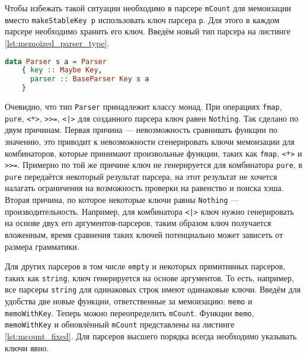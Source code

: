 \documentclass[times]{itmo-student-thesis}
\begin{document}
Чтобы избежать такой ситуации необходимо в парсере \lstinline{mCount} для мемоизации вместо \lstinline{makeStableKey p}
использовать ключ парсера \lstinline{p}. Для этого в каждом парсере необходимо хранить его ключ. Введём новый тип парсера на листинге \ref{lst:memoized_parser_type}. 

\begin{lstlisting}[language=Haskell,float=!h,caption={Тип парсера с ключом},label={lst:memoized_parser_type}]
  data Parser s a = Parser
    { key :: Maybe Key,
      parser :: BaseParser Key s a
    }
\end{lstlisting}

Очевидно, что тип \lstinline{Parser} принадлежит классу монад. При операциях \lstinline{fmap},
\lstinline{pure}, \lstinline{<*>}, \lstinline{>>=}, \lstinline{<|>} для созданного парсера
ключ равен \lstinline{Nothing}. Так сделано по двум причинам. Первая причина --- невозможность сравнивать функции по
значению, это приводит к невозможности сгенерировать ключи мемоизации для комбинаторов, которые принимают произвольные
функции, таких как \lstinline{fmap}, \lstinline{<*>} и \lstinline{>>=}. Примерно по той же причине ключ не
генерируется для  комбинатора \lstinline{pure}, в \lstinline{pure} передаётся некоторый результат парсера, на этот
результат не хочется налагать ограничения на возможность проверки на равенство и поиска хэша. Вторая причина, по
которое некоторые ключи равны \lstinline{Nothing} --- производительность. Например, для комбинатора \lstinline{<|>}
ключ нужно генерировать на основе двух его аргументов-парсеров, таким образом ключ получается вложенным, время сравнения таких ключей потенциально 
может зависеть от размера грамматики. 

Для других парсеров в том числе \lstinline{empty} и некоторых примитивных парсеров, таких как
\lstinline{string}, ключ генерируется на основе аргументов. То есть, например, все парсеры \lstinline{string} для
одинаковых строк имеют одинаковые ключи. Введём для удобства две новые функции, ответственные за мемоизацию:
\lstinline{memo} и \lstinline{memoWithKey}. Теперь можно переопределить
\lstinline{mCount}. Функции \lstinline{memo}, \lstinline{memoWithKey} и обновлённый \lstinline{mCount} представлены на
листинге \ref{lst:mcount_fixed}. Для парсеров высшего порядка всегда необходимо указывать ключи явно.
\end{document}
